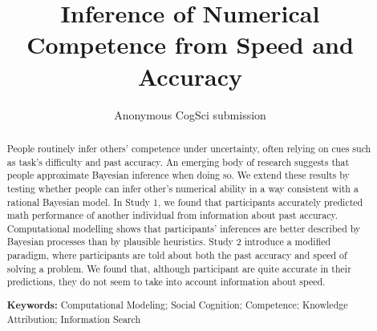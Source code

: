 \documentclass[10pt,letterpaper]{article}
\title{Inference of Numerical Competence from Speed and Accuracy}
\author[1]{Anonymous CogSci submission}
\affil[1]{}
\begin{document}
\maketitle

\begin{abstract}
People routinely infer others' competence under uncertainty, often relying on cues such as task's difficulty and past accuracy. An emerging body of research suggests that people approximate Bayesian inference when doing so. We extend these results by testing whether people can infer other's numerical ability in a way consistent with a rational Bayesian model. In Study 1, we found that participants accurately predicted math performance of another individual from information about past accuracy. Computational modelling shows that participants' inferences are better described by Bayesian processes than by plausible heuristics. Study 2 introduce a modified paradigm, where participants are told about both the past accuracy and speed of solving a problem. We found that, although participant are quite accurate in their predictions, they do not seem to take into account information about speed.

\textbf{Keywords:}
Computational Modeling;
 Social Cognition;
  Competence;
 Knowledge Attribution;
 Information Search
\end{abstract}



\end{document}
